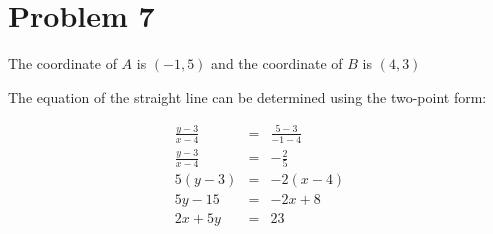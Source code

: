 \section*{Problem 7}
The coordinate of $ A $ is $ (-1, 5) $ and the coordinate of $ B $ is $ (4, 3) $

The equation of the straight line can be determined using the two-point form:

\begin{eqnarray*}
  \frac{y - 3}{x - 4} &=& \frac{5 - 3}{-1 - 4} \\
  \frac{y - 3}{x - 4} &=& -\frac{2}{5}         \\
             5(y - 3) &=& -2(x - 4)            \\
              5y - 15 &=& -2x + 8              \\
              2x + 5y &=& 23
\end{eqnarray*}
